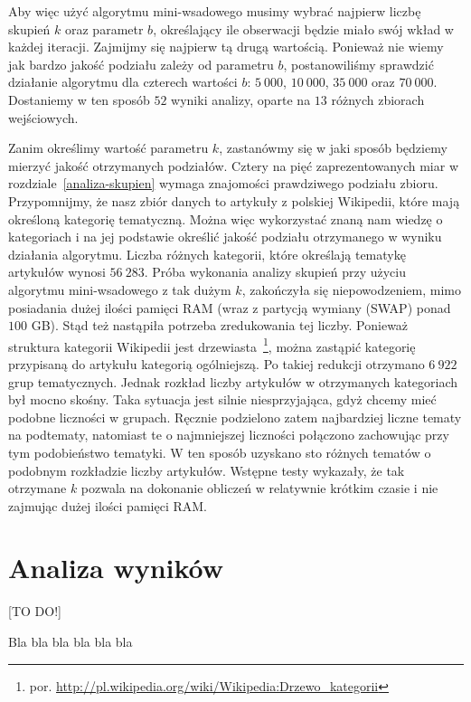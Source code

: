 \documentclass{praca1}
\begin{document}
Aby więc użyć algorytmu mini-wsadowego musimy wybrać najpierw liczbę skupień $k$ oraz parametr $b$, określający ile obserwacji będzie miało swój wkład w każdej iteracji. Zajmijmy się najpierw tą drugą wartością. Ponieważ nie wiemy jak bardzo jakość podziału zależy od parametru $b$, postanowiliśmy sprawdzić działanie algorytmu dla czterech wartości $b$: $5\ 000$, $10\ 000$, $35\ 000$ oraz $70\ 000$. Dostaniemy w ten sposób $52$ wyniki analizy, oparte na $13$ różnych zbiorach wejściowych.

Zanim określimy wartość parametru $k$, zastanówmy się w jaki sposób będziemy mierzyć jakość otrzymanych podziałów. Cztery na pięć zaprezentowanych miar w rozdziale~\ref{analiza-skupien} wymaga znajomości prawdziwego podziału zbioru. Przypomnijmy, że nasz zbiór danych to artykuły z polskiej Wikipedii, które mają określoną kategorię tematyczną. Można więc wykorzystać znaną nam wiedzę o kategoriach i na jej podstawie określić jakość podziału otrzymanego w wyniku działania algorytmu. Liczba różnych kategorii, które określają tematykę artykułów wynosi $56\ 283$. Próba wykonania analizy skupień przy użyciu algorytmu mini-wsadowego z tak dużym $k$, zakończyła się niepowodzeniem, mimo posiadania dużej ilości pamięci RAM (wraz z partycją wymiany (SWAP) ponad $100$ GB). Stąd też nastąpiła potrzeba zredukowania tej liczby. Ponieważ struktura kategorii Wikipedii jest drzewiasta~\footnote{por. \url{http://pl.wikipedia.org/wiki/Wikipedia:Drzewo_kategorii}}, można zastąpić kategorię przypisaną do artykułu kategorią ogólniejszą. Po takiej redukcji otrzymano $6\ 922$ grup tematycznych. Jednak rozkład liczby artykułów w otrzymanych kategoriach był mocno skośny. Taka sytuacja jest silnie niesprzyjająca, gdyż chcemy mieć podobne liczności w grupach. Ręcznie podzielono zatem najbardziej liczne tematy na podtematy, natomiast te o najmniejszej liczności połączono zachowując przy tym podobieństwo tematyki. W ten sposób uzyskano sto różnych tematów o podobnym rozkładzie liczby artykułów. Wstępne testy wykazały, że tak otrzymane $k$ pozwala na dokonanie obliczeń w relatywnie krótkim czasie i nie zajmując dużej ilości pamięci RAM.

\section{Analiza wyników}
 
[TO DO!]

Bla bla bla bla bla bla
\end{document}
